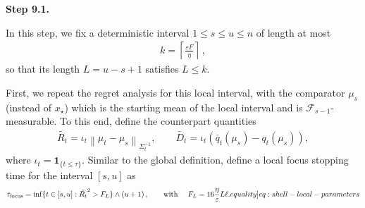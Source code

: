 \documentclass[12pt,cleveref]{jmlr}
\newcommand{\eqlabel}[1]{\label[equality]{#1}}
\newcommand{\proofstepinline}[1]{%
    \par\addvspace{0.6\baselineskip}
    \noindent
    {\normalfont\normalsize\bfseries\color{blue!55!black}Step #1.}\enspace\ignorespaces
}
\newcommand{\F}{\mathcal F}
\newcommand{\1}{\mathbf 1}
\newcommand{\eps}{\varepsilon}
\newcommand{\normm}[2]{\left\lVert #1\right\rVert_{#2}}
\begin{document}
\proofstepinline{9.1}
In this step, we fix a deterministic interval $1\leq s\leq u\leq n$ of length at most
\begin{align}
    k=\left\lceil\frac{\eps F}{\eta}\right\rceil\,,
\end{align}
so that its length $L=u-s+1$ satisfies $L\leq k$.

First, we repeat the regret analysis for this local interval, with the
comparator $\mu_s$ (instead of $x_\star$) which is the starting mean of the local interval and is $\F_{s-1}$-measurable.
To this end, define the counterpart quantities
\begin{align}
    \tilde{R_t}=
    \iota_t
    \normm{\mu_t-\mu_s}{\Sigma_t^{-1}},
    \qquad
    \tilde{D_t}=
    \iota_t
    (\bar q_t(\mu_s)-q_t(\mu_s)),
\end{align}
where $\iota_t = \1_{\{t \leq \tau\}}$.
Similar to the global definition, define a local focus stopping time for the interval $[s,u]$ as
\begin{align}
    \tilde{\tau}_{\mathrm{focus}}=\inf\{t \in [s,u]:\tilde{R_t}^2>F_{L}\}
    \wedge (u+1)\,,\qquad
    \text{with }\quad F_L = 16\frac{\eta}{\eps}L\ell.
    \eqlabel{eq:shell-local-parameters}
\end{align}
\end{document}
